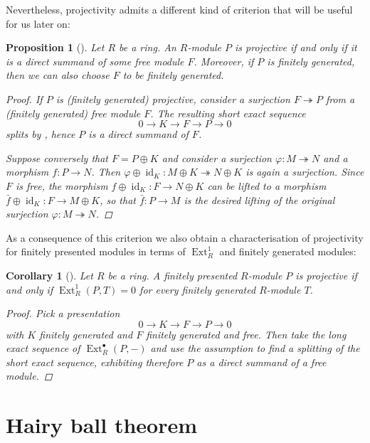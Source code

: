 \documentclass[A4paper, 12pt, british, reqno]{amsart}
\theoremstyle{plain}
\newtheorem{prop}[thm]{Proposition}
\newtheorem{cor}[thm]{Corollary}
\theoremstyle{definition}
\theoremstyle{remark}
\theoremstyle{plain}
\theoremstyle{definition}
\theoremstyle{remark}
\theoremstyle{plain}
\theoremstyle{definition}
\theoremstyle{remark}
\DeclareMathOperator{\Ext}{Ext}
\DeclareMathOperator{\id}{id}
\newcommand{\op}{\oplus}
\begin{document}
Nevertheless, projectivity admits a different kind of criterion that will be useful for us later on:

\begin{prop}[{\cite[Lemma 1.1.2]{fra18}}]\label{prop:projective}
    Let $R$ be a ring.
    An $R$-module $P$ is projective if and only if it is a direct summand of some free module $F$.
    Moreover, if $P$ is finitely generated, then we can also choose $F$ to be finitely generated.
    \begin{proof}
	If $P$ is (finitely generated) projective, consider a surjection $F\twoheadrightarrow P$ from a (finitely generated) free module $F$.
	The resulting short exact sequence
	\[ 0 \to K\to F\to P \to 0 \]
	splits by , hence $P$ is a direct summand of $F$.

	Suppose conversely that $F=P\op K$ and consider a surjection $\varphi\colon M\twoheadrightarrow N$ and a morphism $f\colon P\to N$.
	Then $\varphi\op \id_{K} \colon M\op K\twoheadrightarrow N\op K$ is again a surjection.
	Since $F$ is free, the morphism $f\op \id_{K}\colon F\to N\op K$ can be lifted to a morphism $\bar{f}\op \id_{K}\colon F\to M\op K$, so that $\bar{f}\colon P\to M$ is the desired lifting of the original surjection $\varphi\colon M\twoheadrightarrow N$.
    \end{proof}
\end{prop}

{\color{gray}
As a consequence of this criterion we also obtain a characterisation of projectivity for finitely presented modules in terms of $\Ext^{1}_{R}$ and finitely generated modules:

\begin{cor}[{\cite[Cor.~1.1.28]{fra18}}]
    Let $R$ be a ring.
    A finitely presented $R$-module $P$ is projective if and only if $\Ext^{1}_{R}(P,T)=0$ for every finitely generated $R$-module $T$.
    \begin{proof}
	Pick a presentation
	\[ 0\to K\to F\to P\to 0 \]
	with $K$ finitely generated and $F$ finitely generated and free.
	Then take the long exact sequence of $\Ext^{\bullet}_{R}(P,-)$ and use the assumption to find a splitting of the short exact sequence, exhibiting therefore $P$ as a direct summand of a free module.
    \end{proof}
\end{cor}
}

\section{Hairy ball theorem}
\end{document}
